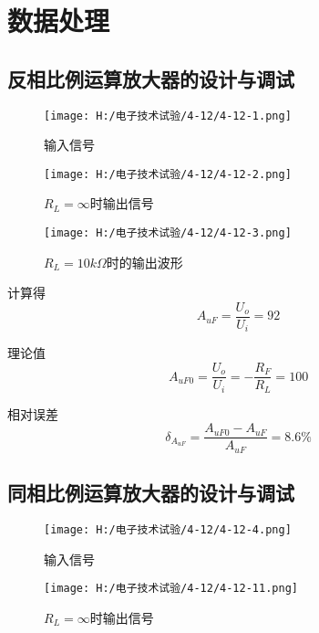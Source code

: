 \documentclass{article}
\begin{document}
\section{ 数据处理}
	\subsection {反相比例运算放大器的设计与调试}
	
	\begin{figure}[h]
		\begin{minipage}[t]{0.5\linewidth} %
		  \centering   
		  \texttt{[image: H:/电子技术试验/4-12/4-12-1.png]}   
		  \caption{输入信号}   
		  \label{fig:side:a}   
		\end{minipage}%
		\begin{minipage}[t]{0.5\linewidth}   
		  \centering   
		  \texttt{[image: H:/电子技术试验/4-12/4-12-2.png]}   
		  \caption{$R_L=\infty$时输出信号}   
		  \label{fig:side:b}   
		\end{minipage}   
		
	  \end{figure}
	
	\begin{figure}[h]
		\centering
		\texttt{[image: H:/电子技术试验/4-12/4-12-3.png]}
		\caption{$R_L=10k\Omega$时的输出波形} \label{fig:aa}
	\end{figure}
	\par
计算得
\begin{equation*}
	\ A_{uF}=\frac{U_o}{U_i}=92
\end{equation*}\par
理论值
\begin{equation*}
	\ A_{uF0}=\frac{U_o}{U_i}=-\frac{R_F}{R_L}=100
\end{equation*}\par
相对误差
\begin{equation*}
	\ \delta_{A_{uF}}=\frac{A_{uF0}-A_{uF}}{A_{uF}}=8.6\%
\end{equation*}
	\newpage
	\subsection {同相比例运算放大器的设计与调试}
	\begin{figure}[h]
		\begin{minipage}[t]{0.5\linewidth} %
		  \centering   
		  \texttt{[image: H:/电子技术试验/4-12/4-12-4.png]}   
		  \caption{输入信号}   
		  \label{fig:side:a}   
		\end{minipage}%
		\begin{minipage}[t]{0.5\linewidth}   
		  \centering   
		  \texttt{[image: H:/电子技术试验/4-12/4-12-11.png]}   
		  \caption{$R_L=\infty$时输出信号}   
		  \label{fig:side:b}   
		\end{minipage}   
		
	  \end{figure}
   
\end{document}

